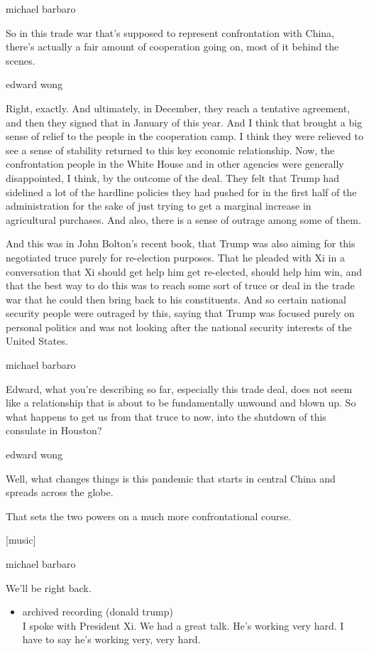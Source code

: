 michael barbaro

So in this trade war that's supposed to represent confrontation with
China, there's actually a fair amount of cooperation going on, most of
it behind the scenes.

edward wong

Right, exactly. And ultimately, in December, they reach a tentative
agreement, and then they signed that in January of this year. And I
think that brought a big sense of relief to the people in the
cooperation camp. I think they were relieved to see a sense of stability
returned to this key economic relationship. Now, the confrontation
people in the White House and in other agencies were generally
disappointed, I think, by the outcome of the deal. They felt that Trump
had sidelined a lot of the hardline policies they had pushed for in the
first half of the administration for the sake of just trying to get a
marginal increase in agricultural purchases. And also, there is a sense
of outrage among some of them.

And this was in John Bolton's recent book, that Trump was also aiming
for this negotiated truce purely for re-election purposes. That he
pleaded with Xi in a conversation that Xi should get help him get
re-elected, should help him win, and that the best way to do this was to
reach some sort of truce or deal in the trade war that he could then
bring back to his constituents. And so certain national security people
were outraged by this, saying that Trump was focused purely on personal
politics and was not looking after the national security interests of
the United States.

michael barbaro

Edward, what you're describing so far, especially this trade deal, does
not seem like a relationship that is about to be fundamentally unwound
and blown up. So what happens to get us from that truce to now, into the
shutdown of this consulate in Houston?

edward wong

Well, what changes things is this pandemic that starts in central China
and spreads across the globe.

That sets the two powers on a much more confrontational course.

{[}music{]}

michael barbaro

We'll be right back.

\begin{itemize}
\tightlist
\item
  archived recording (donald trump)\\
  I spoke with President Xi. We had a great talk. He's working very
  hard. I have to say he's working very, very hard.
\end{itemize}

